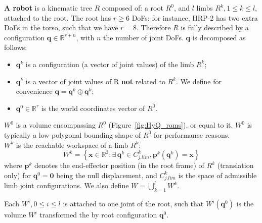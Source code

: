 \medskip
\textbf{A robot} is a kinematic tree $R$ composed of: a root $R^0$, and $l$ limbs $R^k, 1 \leq k \leq l$, attached to the root.
The root has $r \geq 6$ DoFs: for instance, HRP-2 has two extra DoFs in the torso, such that we have $r=8$.
Therefore $R$ is fully described by a configuration $\mathbf{q} \in  \mathbb{R}^{r+n}$, with $n$ the number of joint DoFs.
$\mathbf{q}$ is decomposed as follows:
\begin{itemize}
	\item $\mathbf{q}^k$ is a configuration (a vector of joint values) of the limb $R^k$; %
	\item $\mathbf{q}^{\overline{k}}$ is a vector of joint values of R \textbf{not} related to $R^k$. We define for convenience \mbox{$\mathbf{q}= \mathbf{q}^k \oplus \mathbf{q}^{\overline{k}}$}; %
	\item $\mathbf{q}^{0}\in \mathbb{R}^r$ is the world coordinates vector of $R^0$.
\end{itemize}

\medskip
\noindent $W^0$ is a volume encompassing $R^0$ (Figure~\ref{fig:HyQ_roms}), or equal to it. $W^0$ is typically a low-polygonal bounding shape
of $R^0$ for performance reasons.\\
 $W^k$ is the reachable workspace of a limb $R^k$: %
\begin{equation}
  W^k = \left\{ {\mathbf{x} \in \mathbb{R}^3: \exists \, \mathbf{q}^k \in C^k_{j.lim}, \mathbf{p}^k(\mathbf{q}^k) = \mathbf{x} } \right\}
\end{equation}
where $\mathbf{p}^k$ denotes the end-effector position (in the root frame) of $R^k$ (translation only) for $\mathbf{q}^0 = \mathbf{0}$ being the null displacement, and  $C^k_{j.lim}$ is the space
of admissible limb joint configurations. We also define \mbox{$W = \bigcup_{k=1}^{l}W^k$}. 

Each $W^i, 0 \leq i \leq l$ is  attached to one joint of the root, such that 
$W^i(\mathbf{q}^{0})$ is the volume $W^i$ transformed the by root configuration $\mathbf{q}^{0}$.

